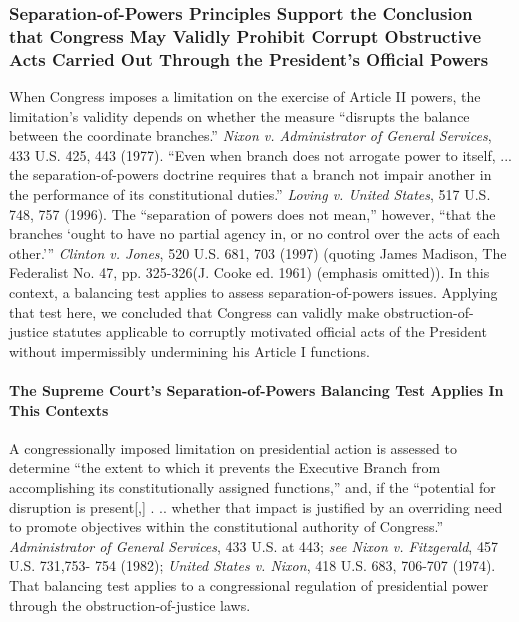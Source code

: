 \subsubsection{Separation-of-Powers Principles Support the Conclusion that Congress May Validly Prohibit Corrupt Obstructive Acts Carried Out Through the President’s Official Powers}

When Congress imposes a limitation on the exercise of Article II powers, the limitation’s validity depends on whether the measure “disrupts the balance between the coordinate branches.”
\textit{Nixon v. Administrator of General Services}, 433 U.S. 425, 443 (1977).
“Even when branch does not arrogate power to itself, ... the separation-of-powers doctrine requires that a branch not impair another in the performance of its constitutional duties.”
\textit{Loving v. United States}, 517 U.S. 748, 757 (1996).
The “separation of powers does not mean,” however, “that the branches ‘ought to have no partial agency in, or no control over the acts of each other.’”
\textit{Clinton v. Jones}, 520 U.S. 681, 703 (1997) (quoting James Madison, The Federalist No. 47, pp. 325-326(J. Cooke ed. 1961) (emphasis omitted)).
In this context, a balancing test applies to assess separation-of-powers issues.
Applying that test here, we concluded that Congress can validly make obstruction-of-justice statutes applicable to corruptly motivated official acts of the President without impermissibly undermining his Article I functions.

\paragraph{The Supreme Court’s Separation-of-Powers Balancing Test Applies In This Contexts}

A congressionally imposed limitation on presidential action is assessed to determine “the extent to which it prevents the Executive Branch from accomplishing its constitutionally assigned functions,” and, if the “potential for disruption is present[,] . .. whether that impact is justified by an overriding need to promote objectives within the constitutional authority of Congress.”
\textit{Administrator of General Services}, 433 U.S. at 443;
\textit{see Nixon v. Fitzgerald}, 457 U.S. 731,753- 754 (1982);
\textit{United States v. Nixon}, 418 U.S. 683, 706-707 (1974).
That balancing test applies to a congressional regulation of presidential power through the obstruction-of-justice laws.%

